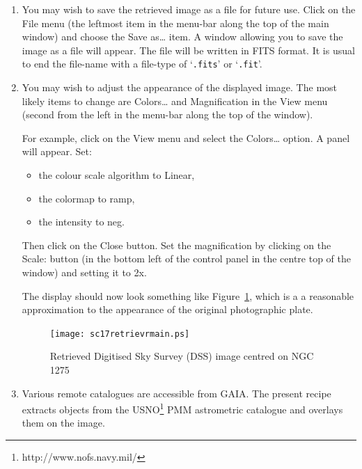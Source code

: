 \documentclass[twoside,11pt]{article}
\newcommand{\htmladdnormallinkfoot}[2]{#1\footnote{#2}}
\renewcommand{\_}{\texttt{\symbol{95}}}
\begin{document}
\begin{enumerate}
  \item You may wish to save the retrieved image as a file for future
   use.  Click on the {\sf File} menu (the leftmost item in the menu-bar
   along the top of the main window) and choose the {\sf Save as\ldots}
   item.  A window allowing you to save the image as a file will appear.
   The file will be written in FITS format.  It is usual to end the
   file-name with a file-type of `{\tt .fits}' or `{\tt .fit}'.

  \item You may wish to adjust the appearance of the displayed image.
   The most likely items to change are {\sf Colors\ldots} and {\sf
   Magnification} in the {\sf View} menu (second from the left in the
   menu-bar along the top of the window).

   For example, click on the {\sf View} menu and select the {\sf
   Colors\ldots} option.  A panel will appear.  Set:

  \begin{itemize}

    \item the colour scale algorithm to {\sf Linear},

    \item the colormap to {\sf ramp},

    \item the intensity to {\sf neg}.

  \end{itemize}

   Then click on the {\sf Close} button.
   Set the magnification by clicking on the {\sf Scale:} button (in the
   bottom left of the control panel in the centre top of the window) and
   setting it to {\sf 2x}.

   The display should now look something like Figure~\ref{RETRIEV_R_MAIN},
   which is a a reasonable approximation to the appearance of the
   original photographic plate.

  \begin{figure}[htbp]
     \centering
     \texttt{[image: sc17\_retriev\_r\_main.ps]}
     \begin{quote}
     \caption[Retrieved DSS image centred on NGC 1275]
     {Retrieved Digitised Sky Survey (DSS) image centred on NGC 1275
     \label{RETRIEV_R_MAIN} }
     \end{quote}
  \end{figure}

  \item Various remote catalogues are accessible from GAIA.  The present
   recipe extracts objects from the 
   \htmladdnormallinkfoot{USNO}{http://www.nofs.navy.mil/} PMM astrometric
   catalogue\cite{PMM} and overlays them on the image.


\end{enumerate}
\end{document}
